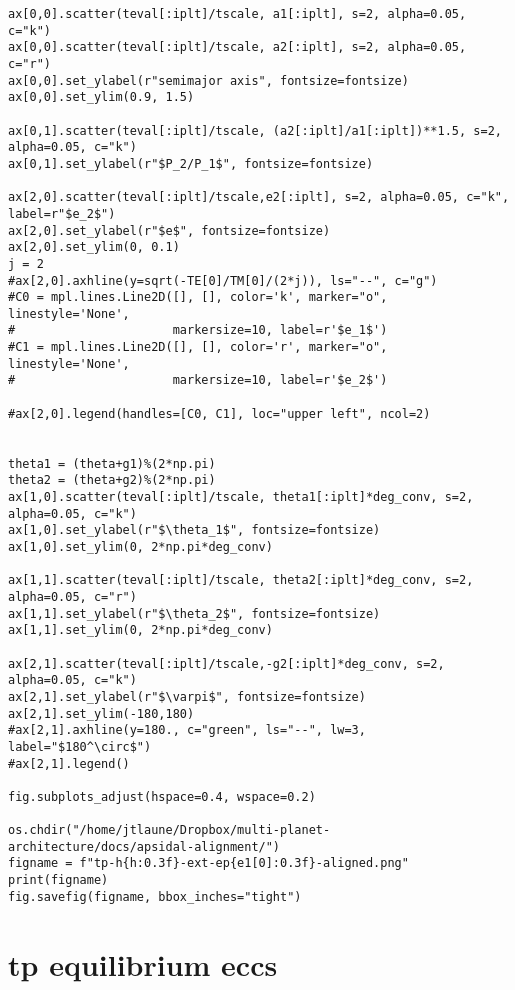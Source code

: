 \documentclass[11pt]{article}
\begin{document}
\begin{verbatim}
ax[0,0].scatter(teval[:iplt]/tscale, a1[:iplt], s=2, alpha=0.05, c="k")
ax[0,0].scatter(teval[:iplt]/tscale, a2[:iplt], s=2, alpha=0.05, c="r")
ax[0,0].set_ylabel(r"semimajor axis", fontsize=fontsize)
ax[0,0].set_ylim(0.9, 1.5)

ax[0,1].scatter(teval[:iplt]/tscale, (a2[:iplt]/a1[:iplt])**1.5, s=2, alpha=0.05, c="k")
ax[0,1].set_ylabel(r"$P_2/P_1$", fontsize=fontsize)

ax[2,0].scatter(teval[:iplt]/tscale,e2[:iplt], s=2, alpha=0.05, c="k", label=r"$e_2$")
ax[2,0].set_ylabel(r"$e$", fontsize=fontsize)
ax[2,0].set_ylim(0, 0.1)
j = 2
#ax[2,0].axhline(y=sqrt(-TE[0]/TM[0]/(2*j)), ls="--", c="g")
#C0 = mpl.lines.Line2D([], [], color='k', marker="o", linestyle='None',
#                      markersize=10, label=r'$e_1$')
#C1 = mpl.lines.Line2D([], [], color='r', marker="o", linestyle='None',
#                      markersize=10, label=r'$e_2$')

#ax[2,0].legend(handles=[C0, C1], loc="upper left", ncol=2)


theta1 = (theta+g1)%(2*np.pi)
theta2 = (theta+g2)%(2*np.pi)
ax[1,0].scatter(teval[:iplt]/tscale, theta1[:iplt]*deg_conv, s=2, alpha=0.05, c="k")
ax[1,0].set_ylabel(r"$\theta_1$", fontsize=fontsize)
ax[1,0].set_ylim(0, 2*np.pi*deg_conv)

ax[1,1].scatter(teval[:iplt]/tscale, theta2[:iplt]*deg_conv, s=2, alpha=0.05, c="r")
ax[1,1].set_ylabel(r"$\theta_2$", fontsize=fontsize)
ax[1,1].set_ylim(0, 2*np.pi*deg_conv)

ax[2,1].scatter(teval[:iplt]/tscale,-g2[:iplt]*deg_conv, s=2, alpha=0.05, c="k")
ax[2,1].set_ylabel(r"$\varpi$", fontsize=fontsize)
ax[2,1].set_ylim(-180,180)
#ax[2,1].axhline(y=180., c="green", ls="--", lw=3, label="$180^\circ$")
#ax[2,1].legend()

fig.subplots_adjust(hspace=0.4, wspace=0.2)

os.chdir("/home/jtlaune/Dropbox/multi-planet-architecture/docs/apsidal-alignment/")
figname = f"tp-h{h:0.3f}-ext-ep{e1[0]:0.3f}-aligned.png"
print(figname)
fig.savefig(figname, bbox_inches="tight")
\end{verbatim}

\section{tp equilibrium eccs}
\label{sec:orgc9be30c}
\end{document}
